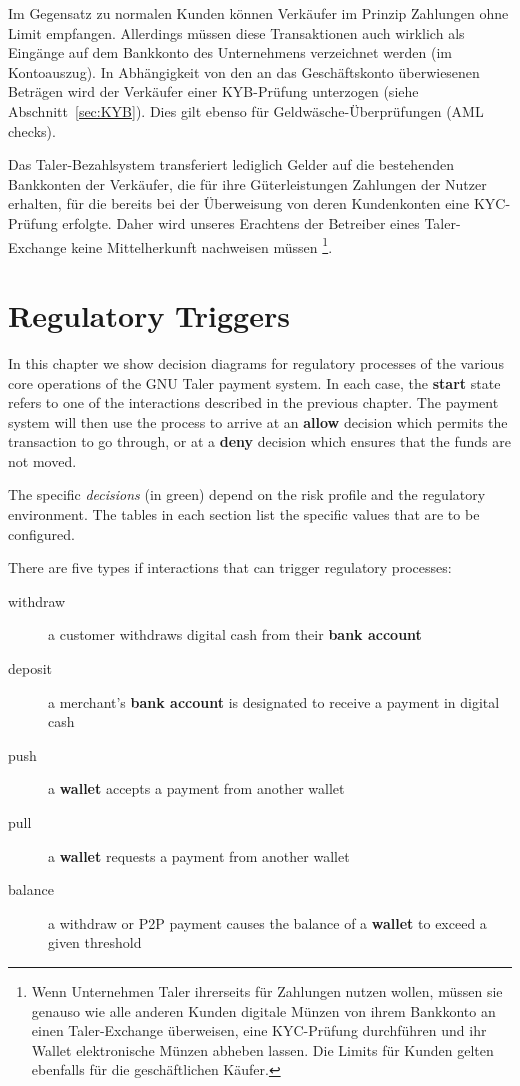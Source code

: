 \documentclass[10pt,a4paper,oneside]{book}
\begin{document}
Im Gegensatz zu normalen Kunden k\"onnen Verk\"aufer im Prinzip
Zahlungen ohne Limit empfangen. Allerdings m\"ussen diese Transaktionen
auch wirklich als Eing\"ange auf dem Bankkonto des Unternehmens verzeichnet
werden (im Kontoauszug). In Abh\"angigkeit von den an das Gesch\"aftskonto
\"uberwiesenen Betr\"agen wird der Verk\"aufer einer KYB-Pr\"ufung unterzogen
(siehe Abschnitt~\ref{sec:KYB}). Dies gilt ebenso f\"ur
Geldw\"asche-\"Uberpr\"ufungen (AML checks).

Das Taler-Bezahlsystem transferiert lediglich Gelder auf die bestehenden
Bankkonten der Verk\"aufer, die f\"ur ihre G\"uterleistungen Zahlungen
der Nutzer erhalten, f\"ur die bereits bei der \"Uberweisung von deren
Kundenkonten eine KYC-Pr\"ufung erfolgte. Daher wird unseres Erachtens
der Betreiber eines Taler-Exchange keine Mittelherkunft nachweisen m\"ussen
\footnote{Wenn Unternehmen Taler ihrerseits f\"ur Zahlungen nutzen wollen,
m\"ussen sie genauso wie alle anderen Kunden digitale M\"unzen von
ihrem Bankkonto an einen Taler-Exchange \"uberweisen, eine KYC-Pr\"ufung
durchf\"uhren und ihr Wallet elektronische M\"unzen abheben lassen.
Die Limits für Kunden gelten ebenfalls f\"ur die gesch\"aftlichen K\"aufer.}.












\chapter{Regulatory Triggers} \label{chap:triggers}

In this chapter we show decision diagrams for regulatory processes of the
various core operations of the GNU Taler payment system.  In each case, the
{\bf start} state refers to one of the interactions described in the previous
chapter.  The payment system will then use the process to arrive at an {\bf
  allow} decision which permits the transaction to go through, or at a {\bf
  deny} decision which ensures that the funds are not moved.

The specific {\em decisions} (in green) depend on the risk profile and the
regulatory environment. The tables in each section list the specific values
that are to be configured.

There are five types if interactions that can trigger regulatory processes:

\begin{description}
  \item[withdraw] a customer withdraws digital cash from their {\bf bank account}
  \item[deposit] a merchant's {\bf bank account} is designated to receive a payment in digital cash
  \item[push] a {\bf wallet} accepts a payment from another wallet
  \item[pull] a {\bf wallet} requests a payment from another wallet
  \item[balance] a withdraw or P2P payment causes the balance of a {\bf wallet} to exceed a given threshold
\end{description}
\end{document}
